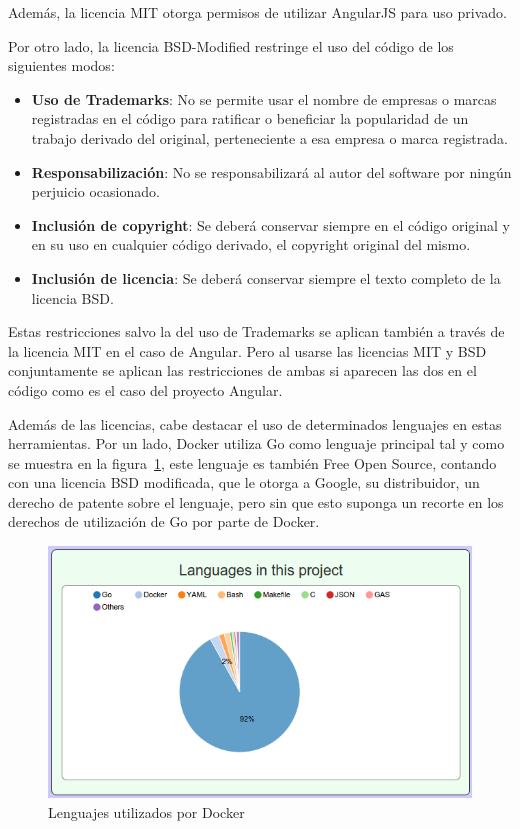 \documentclass[a4paper, spanish, 12pt]{book}
\begin{document}
Adem\'as, la licencia MIT otorga permisos de utilizar AngularJS para uso privado.

Por otro lado, la licencia BSD-Modified restringe el uso del c\'odigo de los siguientes modos:

\begin{itemize}
	\item \textbf{Uso de Trademarks}: No se permite usar el nombre de empresas o marcas registradas en el c\'odigo
	para ratificar o beneficiar la popularidad de un trabajo derivado del original, perteneciente a esa empresa o marca registrada.

	\item \textbf{Responsabilizaci\'on}: No se responsabilizar\'a al autor del software por ning\'un perjuicio ocasionado.

	\item \textbf{Inclusi\'on de copyright}: Se deber\'a conservar siempre en el c\'odigo original y en su uso
	en cualquier c\'odigo derivado, el copyright original del mismo.

	\item \textbf{Inclusi\'on de licencia}: Se deber\'a conservar siempre el texto completo de la licencia BSD.
\end{itemize}

Estas restricciones salvo la del uso de Trademarks se aplican tambi\'en a trav\'es de la licencia MIT en el caso de Angular.
Pero al usarse las licencias MIT y BSD conjuntamente se aplican las restricciones de ambas si aparecen las dos en el c\'odigo
como es el caso del proyecto Angular.

Adem\'as de las licencias, cabe destacar el uso de determinados lenguajes en estas herramientas. Por un lado, Docker utiliza
Go como lenguaje principal tal y como se muestra en la figura~\ref{fig:docker_lang}, este lenguaje es tambi\'en Free Open Source,
contando con una licencia BSD modificada, que le otorga a Google, su distribuidor, un derecho de patente sobre el lenguaje,
pero sin que esto suponga un recorte en los derechos de utilizaci\'on de Go por parte de Docker.

\begin{figure}
  \centering
  \includegraphics[width=14cm, keepaspectratio]{img/languages_docker}
  \caption{Lenguajes utilizados por Docker}
  \label{fig:docker_lang}
\end{figure}
\end{document}
